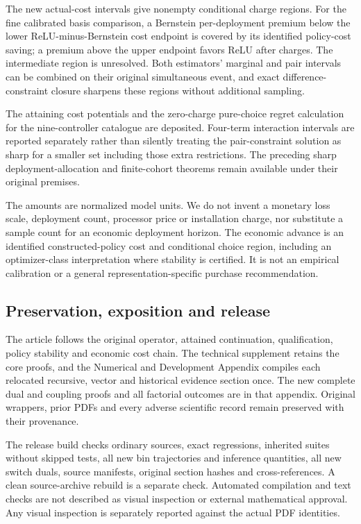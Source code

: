 The new actual-cost intervals give nonempty conditional charge regions.
For the fine calibrated basis comparison, a Bernstein per-deployment
premium below the lower ReLU-minus-Bernstein cost endpoint is covered by
its identified policy-cost saving; a premium above the upper endpoint
favors ReLU after charges. The intermediate region is unresolved. Both
estimators' marginal and pair intervals can be combined on their
original simultaneous event, and exact difference-constraint closure
sharpens these regions without additional sampling.

The attaining cost potentials and the zero-charge pure-choice regret
calculation for the nine-controller catalogue are deposited. Four-term
interaction intervals are reported separately rather than silently
treating the pair-constraint solution as sharp for a smaller set
including those extra restrictions. The preceding sharp
deployment-allocation and finite-cohort theorems remain available under
their original premises.

The amounts are normalized model units. We do not invent a monetary loss
scale, deployment count, processor price or installation charge, nor
substitute a sample count for an economic deployment horizon. The
economic advance is an identified constructed-policy cost and
conditional choice region, including an optimizer-class interpretation
where stability is certified. It is not an empirical calibration or a
general representation-specific purchase recommendation.

\hypertarget{preservation-exposition-and-release}{%
\subsection{Preservation, exposition and
release}\label{preservation-exposition-and-release}}

The article follows the original operator, attained continuation,
qualification, policy stability and economic cost chain. The technical
supplement retains the core proofs, and the Numerical and Development
Appendix compiles each relocated recursive, vector and historical
evidence section once. The new complete dual and coupling proofs and all
factorial outcomes are in that appendix. Original wrappers, prior PDFs
and every adverse scientific record remain preserved with their
provenance.

The release build checks ordinary sources, exact regressions, inherited
suites without skipped tests, all new bin trajectories and inference
quantities, all new switch duals, source manifests, original section
hashes and cross-references. A clean source-archive rebuild is a
separate check. Automated compilation and text checks are not described
as visual inspection or external mathematical approval. Any visual
inspection is separately reported against the actual PDF identities.

